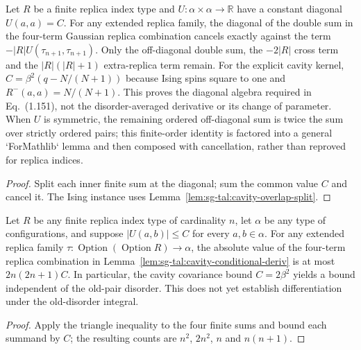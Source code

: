 \begin{lemma}
\label{lem:sg-tal:cavity-diagonal-cancel}
  \leanok
{}
Let $R$ be a finite replica index type and $U:\alpha\times\alpha\to\mathbb R$
have a constant diagonal $U(a,a)=C$. For any extended replica family,
the diagonal of the double sum in the four-term Gaussian replica combination
cancels exactly against the term $-|R|U(\tau_{n+1},\tau_{n+1})$.
Only the off-diagonal double sum, the $-2|R|$ cross term and the
$|R|(|R|+1)$ extra-replica term remain. For the explicit cavity kernel,
$C=\beta^2(q-N/(N+1))$ because Ising spins square to one and
$R^-(a,a)=N/(N+1)$. This proves the diagonal algebra required in
Eq.~(1.151), not the disorder-averaged derivative or its change of parameter.
When $U$ is symmetric, the remaining ordered off-diagonal sum is twice the
sum over strictly ordered pairs; this finite-order identity is factored into
a general `ForMathlib` lemma and then composed with cancellation, rather than
reproved for replica indices.
\end{lemma}
\begin{proof}
  \leanok
Split each inner finite sum at the diagonal; sum the common value $C$
and cancel it. The Ising instance uses
Lemma~\ref{lem:sg-tal:cavity-overlap-split}.
\end{proof}

\begin{lemma}
\label{lem:sg-tal:cavity-combination-bound}
  \leanok
{}
Let $R$ be any finite replica index type of cardinality $n$, let $\alpha$ be
any type of configurations, and suppose $|U(a,b)|\le C$ for every $a,b\in\alpha$.
For any extended replica family $\tau:\operatorname{Option}(\operatorname{Option}R)
\to\alpha$, the absolute value of the four-term replica combination in
Lemma~\ref{lem:sg-tal:cavity-conditional-deriv} is at most
$2n(2n+1)C$. In particular, the cavity covariance bound
$C=2\beta^2$ yields a bound independent of the old-pair disorder.
This does not yet establish differentiation under the old-disorder integral.
\end{lemma}
\begin{proof}
  \leanok
Apply the triangle inequality to the four finite sums and bound each
summand by $C$; the resulting counts are $n^2$, $2n^2$, $n$ and $n(n+1)$.
\end{proof}

